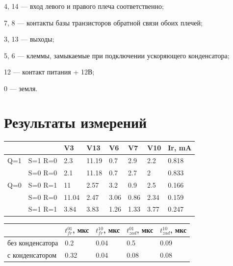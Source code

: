 \documentclass[a4paper,14pt]{article}
\begin{document}
4, 14 — вход левого и правого плеча соответственно;

7, 8 — контакты базы транзисторов обратной связи обоих плечей;

3, 13 — выходы;

5, 6 — клеммы, замыкаемые при подключении ускоряющего конденсатора;

12 — контакт питания + 12В;

0 — земля.

\section{Результаты измерений}

\begin{table}[H]
	\begin{center}
	\begin{tabular}{|l|l|l|l|l|l|l|l|}
		\hline
		&         & V3    & V13   & V6   & V7   & V10  & Ir, mA \\ \hline
		Q=1 & S=1 R=0 & 2.3   & 11.19 & 0.7  & 2.9  & 2.2  & 0.818  \\ \hline
		& S=0 R=0 & 2.1   & 11.18 & 0.7  & 2.7  & 2    & 0.833  \\ \hline
		Q=0 & S=0 R=1 & 11    & 2.57  & 3.2  & 0.9  & 2.5  & 0.166  \\ \hline
		& S=0 R=0 & 11.04 & 2.47  & 3.06 & 0.86 & 2.34 & 0.159  \\ \hline
		& S=1 R=1 & 3.84  & 3.83  & 1.26 & 1.33 & 3.77 & 0.247  \\ \hline
	\end{tabular}
\end{center}
\end{table}

\begin{table}[H]
	\begin{center}
	\begin{tabular}{|l|l|l|l|l|}
		\hline
		& $t_{fr}^{01}$, мкс & $t_{fr}^{10}$, мкс & $t_{zad}^{01}$, мкс & $t_{zad}^{10}$, мкс \\ \hline
		без конденсатора & 0.2   & 0.04  & 0.5    & 0.09   \\ \hline
		с конденсатором  & 0.32  & 0.04  & 0.08   & 0.08   \\ \hline
	\end{tabular}
\end{center}
\end{table}
\end{document}
